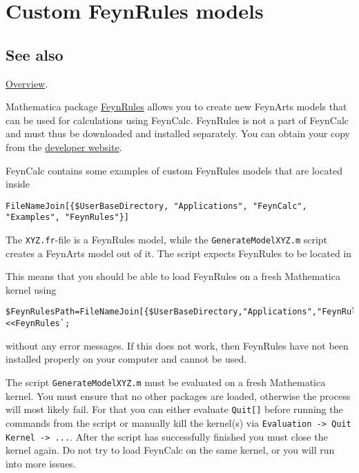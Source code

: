 \documentclass[../FeynCalcManual.tex]{subfiles}
\begin{document}
\hypertarget{custom feynrules models}{
\section{Custom FeynRules models}\label{custom feynrules models}}

\subsection{See also}

\hyperlink{toc}{Overview}.

Mathematica package \href{https://feynrules.irmp.ucl.ac.be/}{FeynRules}
allows you to create new FeynArts models that can be used for
calculations using FeynCalc. FeynRules is not a part of FeynCalc and
must thus be downloaded and installed separately. You can obtain your
copy from the \href{https://feynrules.irmp.ucl.ac.be/}{developer
website}.

FeynCalc contains some examples of custom FeynRules models that are
located inside

\begin{verbatim}
FileNameJoin[{$UserBaseDirectory, "Applications", "FeynCalc", "Examples", "FeynRules"}]
\end{verbatim}

The \texttt{XYZ.fr}-file is a FeynRules model, while the
\texttt{GenerateModelXYZ.m} script creates a FeynArts model out of it.
The script expects FeynRules to be located in

\begin{Shaded}
\begin{Highlighting}[]
   \OperatorTok{[\{}\OperatorTok{,}\OperatorTok{,}\OperatorTok{\}]}
\end{Highlighting}
\end{Shaded}

This means that you should be able to load FeynRules on a fresh
Mathematica kernel using

\begin{verbatim}
$FeynRulesPath=FileNameJoin[{$UserBaseDirectory,"Applications","FeynRules"}];
<<FeynRules`;
\end{verbatim}

without any error messages. If this does not work, then FeynRules have
not been installed properly on your computer and cannot be used.

The script \texttt{GenerateModelXYZ.m} must be evaluated on a fresh
Mathematica kernel. You must ensure that no other packages are loaded,
otherwise the process will most likely fail. For that you can either
evaluate \texttt{Quit[\allowbreak{}]} before running the commands from
the script or manually kill the kernel(s) via
\texttt{Evaluation -> Quit Kernel -> ...}. After the script has
successfully finished you must close the kernel again. Do not try to
load FeynCalc on the same kernel, or you will run into more issues.
\end{document}
